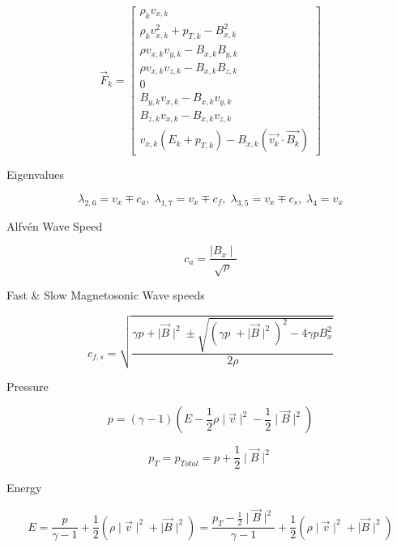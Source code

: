 \begin{equation}
    \vec{F}_k = \begin{bmatrix}
            \rho_k v_{x,k} \\
            \rho_k v_{x,k}^2 + p_{T,k} - B_{x,k}^2 \\
            \rho v_{x,k} v_{y,k} - B_{x,k} B_{y,k} \\
            \rho v_{x,k} v_{z,k} - B_{x,k} B_{z,k} \\
            0 \\
            B_{y,k} v_{x,k} - B_{x,k} v_{y,k} \\
            B_{z,k} v_{x,k} - B_{x,k} v_{z,k} \\
            v_{x,k} \left( E_k + p_{T,k} \right) - B_{x,k} \left( \vec{v_k} \cdot \vec{B_k} \right)
         \end{bmatrix}
\end{equation}

Eigenvalues

\begin{equation}
    \lambda_{2,6} = v_x \mp c_a, \;
    \lambda_{1,7} = v_x \mp c_f, \;
    \lambda_{3,5} = v_x \mp c_s, \;
    \lambda_{4} = v_x
\end{equation}

Alfv\'en Wave Speed

\begin{equation}
    c_a = \frac{\mid B_x \mid}{\sqrt{\rho}}
\end{equation}

Fast \& Slow Magnetosonic Wave speeds

\begin{equation}
    c_{f,s} = \sqrt{\frac
    {\gamma p + \mid \vec{B} \mid^2 \pm \sqrt{\left( \gamma p \;+ \mid \vec{B} \mid^2 \right)^2 - 4\gamma p B_x^2 } }
    {2\rho}}
\end{equation}

Pressure

\begin{equation}
    p = \left( \gamma - 1 \right)
        \left( E - \frac{1}{2} \rho \mid \vec{v}\mid ^2 - \frac{1}{2} \mid \vec{B} \mid ^2 \right)
\end{equation}

\begin{equation}
    p_T = p_{Total} = p + \frac{1}{2} \mid \vec{B} \mid ^2
\end{equation}

Energy

\begin{equation}
    E = \frac{p}{\gamma - 1} + \frac{1}{2}\left( \rho \mid \vec{v} \mid ^2 + \mid \vec{B} \mid ^2\right)
      = \frac{p_T - \frac{1}{2}\mid \vec{B} \mid^2 }{\gamma - 1} + \frac{1}{2}\left( \rho \mid \vec{v} \mid ^2 + \mid \vec{B} \mid ^2\right)
\end{equation}
